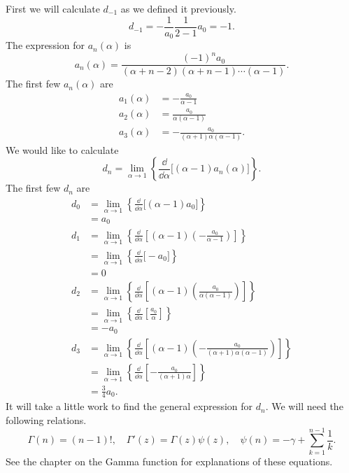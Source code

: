 \begin{Example}
  First we will calculate $d_{-1}$ as we defined it previously.
  \[ d_{-1} = - \frac{1}{a_0} \frac{1}{2-1} a_0 = -1. \]
  The expression for $a_n(\alpha)$ is
  \[ a_n(\alpha) = \frac{(-1)^n a_0}{(\alpha+n-2)(\alpha+n-1) 
    \cdots(\alpha-1)}. \]
  The first few $a_n(\alpha)$ are
  \begin{align*}
    a_1(\alpha) &= - \frac{a_0}{\alpha-1} \\
    a_2(\alpha) &= \frac{a_0}{\alpha(\alpha-1)} \\
    a_3(\alpha) &= -\frac{a_0}{(\alpha+1)\alpha(\alpha-1)}.
  \end{align*}
  We would like to calculate
  \[ d_n = \lim_{\alpha \to 1} \left\{
    \frac{\dd}{\dd \alpha} \Big[(\alpha-1)a_n(\alpha)\Big] \right\}. \]
  The first few $d_n$ are
  \begin{align*}
    d_0     &= \lim_{\alpha \to 1} \left\{
      \frac{\dd}{\dd \alpha} \Big[(\alpha-1) a_0\Big] \right\} \\
    &= a_0 \\
    d_1     &= \lim_{\alpha \to 1} \left\{
      \frac{\dd}{\dd \alpha} \left[(\alpha-1)
        \left( - \frac{a_0}{\alpha-1} \right)\right] \right\} \\
    &= \lim_{\alpha \to 1} \left\{
      \frac{\dd}{\dd \alpha} \Big[-a_0\Big] \right\} \\
    &= 0 \\
    d_2     &= \lim_{\alpha \to 1} \left\{
      \frac{\dd}{\dd \alpha} \left[(\alpha-1)
        \left( \frac{a_0}{\alpha(\alpha-1)} \right)\right] \right\} \\
    &= \lim_{\alpha \to 1} \left\{
      \frac{\dd}{\dd \alpha} \left[\frac{a_0}{\alpha}\right]\right\} \\
    &= -a_0 \\
    d_3     &= \lim_{\alpha \to 1} \left\{
      \frac{\dd}{\dd \alpha} \left[(\alpha-1)
        \left( -\frac{a_0}{(\alpha+1)\alpha(\alpha-1)}
        \right)\right] \right\} \\
    &= \lim_{\alpha \to 1} \left\{
      \frac{\dd}{\dd \alpha} \left[-\frac{a_0}{(\alpha+1)\alpha} \right] \right\} \\
    &= \frac{3}{4}a_0.
  \end{align*}
  It will take a little work to find the general
  expression for $d_n$.  We will need the
  following relations.
  \[ \Gamma(n) = (n-1)!, \quad \Gamma'(z) = \Gamma(z) \psi(z), \quad
  \psi(n) = - \gamma + \sum_{k=1}^{n-1} \frac{1}{k}. \]
  See the chapter on the Gamma function for explanations of these equations.

\end{Example}
